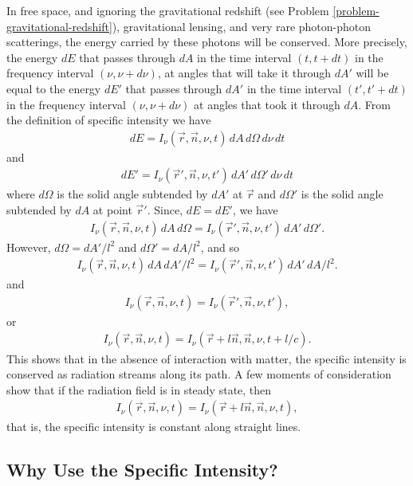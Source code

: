 In free space, and ignoring the gravitational redshift (see Problem
\ref{problem-gravitational-redshift}), gravitational lensing, and very
rare photon-photon scatterings, the energy carried by these photons will
be conserved. More precisely, the energy $dE$ that passes through $dA$
in the time interval $(t,t+dt)$ in the frequency interval
$(\nu,\nu+d\nu)$, at angles that will take it through $dA'$ will be
equal to the energy $dE'$ that passes through $dA'$ in the time interval
$(t',t'+dt)$ in the frequency interval $(\nu,\nu+d\nu)$ at angles that
took it through $dA$. From the definition of specific intensity we have
\begin{align}
dE = I_\nu(\vec r, \vec n, \nu, t)\,dA\,d\Omega\,d\nu\,dt
\end{align}
and
\begin{align}
dE' = I_\nu(\vec r', \vec n, \nu, t')\,dA'\,d\Omega'\,d\nu\,dt
\end{align}
where $d\Omega$ is the solid angle subtended by $dA'$ at $\vec r$ and
$d\Omega'$ is the solid angle subtended by $dA$ at point $\vec r'$.
Since, $dE = dE'$, we have
\begin{align}
I_\nu(\vec r, \vec n, \nu, t)\,dA\,d\Omega = 
I_\nu(\vec r', \vec n, \nu, t')\,dA'\,d\Omega'.
\end{align}
\newslide
However, $d\Omega = dA'/l^2$ and $d\Omega' = dA/l^2$, and so
\begin{align}
I_\nu(\vec r, \vec n, \nu, t)\,dA\,dA'/l^2 = 
I_\nu(\vec r', \vec n, \nu, t')\,dA'\,dA/l^2.
\end{align}
and
\begin{align}
I_\nu(\vec r, \vec n, \nu, t) = 
I_\nu(\vec r', \vec n, \nu, t'),
\end{align}
or
\begin{align}
I_\nu(\vec r, \vec n, \nu, t) = 
I_\nu(\vec r + l\vec n, \vec n, \nu, t + l/c).
\end{align}
This shows that in the absence of interaction with matter, the specific
intensity is conserved as radiation streams along its path. A few
moments of consideration show that if the radiation field is in
steady state, then
\begin{align}
I_\nu(\vec r, \vec n, \nu, t) = 
I_\nu(\vec r + l\vec n, \vec n, \nu, t),
\end{align}
that is, the specific intensity is constant along straight lines.

\newslide

\subsection{Why Use the Specific Intensity?}

